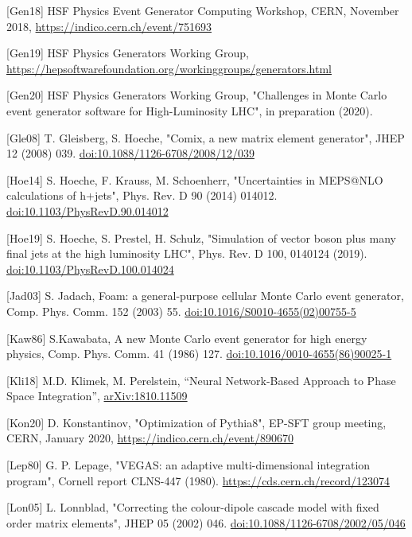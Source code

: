 \documentclass[10pt,a4paper]{article}
\begin{document}
{[}Gen18{]} HSF Physics Event Generator Computing Workshop, CERN,
November 2018,
\href{https://indico.cern.ch/event/751693}{{https://indico.cern.ch/event/751693}}

{[}Gen19{]} HSF Physics Generators Working Group,
\href{https://hepsoftwarefoundation.org/workinggroups/generators.html}{{https://hepsoftwarefoundation.org/workinggroups/generators.html}}

{[}Gen20{]} HSF Physics Generators Working Group, "Challenges in Monte
Carlo event generator software for High-Luminosity LHC", in preparation
(2020).

{[}Gle08{]} T. Gleisberg, S. Hoeche, "Comix, a new matrix element
generator", JHEP 12 (2008) 039.
\href{https://doi.org/10.1088/1126-6708/2008/12/039}{{doi:10.1088/1126-6708/2008/12/039}}

{[}Hoe14{]} S. Hoeche, F. Krauss, M. Schoenherr, "Uncertainties in
MEPS@NLO calculations of h+jets", Phys. Rev. D 90 (2014) 014012.
\href{https://doi.org/10.1103/PhysRevD.90.014012}{{doi:10.1103/PhysRevD.90.014012}}

{[}Hoe19{]} S. Hoeche, S. Prestel, H. Schulz, "Simulation of vector
boson plus many final jets at the high luminosity LHC", Phys. Rev. D
100, 0140124 (2019).
\href{http://dx.doi.org/10.1103/PhysRevD.100.014024}{{doi:10.1103/PhysRevD.100.014024}}

{[}Jad03{]} S. Jadach, Foam: a general-purpose cellular Monte Carlo
event generator, Comp. Phys. Comm. 152 (2003) 55.
\href{https://doi.org/10.1016/S0010-4655(02)00755-5}{{doi:10.1016/S0010-4655(02)00755-5}}

{[}Kaw86{]} S.Kawabata, A new Monte Carlo event generator for high
energy physics, Comp. Phys. Comm. 41 (1986) 127.
\href{https://doi.org/10.1016/0010-4655(86)90025-1}{{doi:10.1016/0010-4655(86)90025-1}}

{[}Kli18{]} M.D. Klimek, M. Perelstein, ``Neural Network-Based Approach
to Phase Space Integration'',
\href{https://arxiv.org/abs/1810.11509}{{arXiv:1810.11509}}

{[}Kon20{]} D. Konstantinov, "Optimization of Pythia8", EP-SFT group
meeting, CERN, January 2020,
\href{https://indico.cern.ch/event/890670}{{https://indico.cern.ch/event/890670}}

{[}Lep80{]} G. P. Lepage, "VEGAS: an adaptive multi-dimensional
integration program", Cornell report CLNS-447 (1980).
\href{https://cds.cern.ch/record/123074}{{https://cds.cern.ch/record/123074}}

{[}Lon05{]} L. Lonnblad, "Correcting the colour-dipole cascade model
with fixed order matrix elements", JHEP 05 (2002) 046.
\href{https://doi.org/10.1088/1126-6708/2002/05/046}{{doi:10.1088/1126-6708/2002/05/046}}
\end{document}
